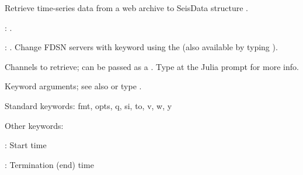 \documentclass[letterpaper,11pt,english]{sphinxmanual}
\begin{document}
\begin{DUlineblock}{0em}
\item[] Retrieve time-series data from a web archive to SeisData structure .
\item[] 
\item[] 
\item[] : {\hyperref[\detokenize{src/Web/webclients:irisws}]{}}.
\item[] : {\hyperref[\detokenize{src/Web/webclients:fdsnws}]{}}. Change FDSN servers with keyword  using the {\hyperref[\detokenize{src/Appendices/web_syntax:servers}]{}} (also available by typing ).
\item[] 
\item[] 
\item[] Channels to retrieve; can be passed as a {\hyperref[\detokenize{src/Appendices/web_syntax:cid}]{}}. Type  at the Julia prompt for more info.
\item[] 
\item[] 
\item[] Keyword arguments; see also {\hyperref[\detokenize{src/Appendices/keywords:dkw}]{}} or type .
\item[] Standard keywords: fmt, opts, q, si, to, v, w, y
\item[] Other keywords:
\item[] : Start time
\item[] : Termination (end) time
\end{DUlineblock}
\end{document}
